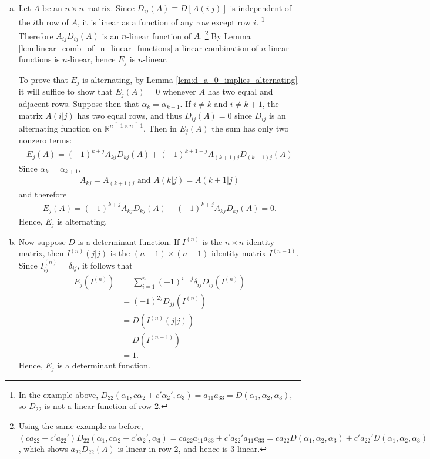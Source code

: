 \documentclass[12pt,letterpaper,reqno]{article}
\numberwithin{equation}{section}
\begin{document}
\begin{pf}
\begin{enumerate}[(a)]
	 \item Let $A$ be an $n \times n$ matrix. Since $D_{ij}(A)\equiv D[A(i \vert j)]$ is independent of the $i$th row of $A$, it is linear as a function of any row except row $i$. \footnote{In the example above, $D_{22}(\alpha_1,c\alpha_2+c'\alpha_2',\alpha_3)=a_{11}a_{33}=D(\alpha_1,\alpha_2,\alpha_3)$, so $D_{22}$ is not a linear function of row 2.} Therefore $A_{ij}D_{ij}(A)$ is an $n$-linear function of $A$. \footnote{Using the same example as before, $(ca_{22}+c'a_{22}')D_{22}(\alpha_1,c\alpha_2+c'\alpha_2',\alpha_3)=ca_{22}a_{11}a_{33}+c'a_{22}'a_{11}a_{33}=ca_{22}D(\alpha_1,\alpha_2,\alpha_3)+c'a_{22}'D(\alpha_1,\alpha_2,\alpha_3)$, which shows $a_{22}D_{22}(A)$ is linear in row 2, and hence is 3-linear.} By Lemma \ref{lem:linear_comb_of_n_linear_functions} a linear combination of $n$-linear functions is $n$-linear, hence $E_j$ is $n$-linear. 
	
	To prove that $E_j$ is alternating, by Lemma \ref{lem:d_a_0_implies_alternating} it will suffice to show that $E_j(A)=0$ whenever $A$ has two equal and adjacent rows. Suppose then that $\alpha_k=\alpha_{k+1}$. If $i \neq k$ and $i \neq k+1$, the matrix $A(i \vert j)$ has two equal rows, and thus $D_{ij}(A)=0$ since $D_{ij}$ is an alternating function on $\mathbb{R}^{\overline{n-1} \times \overline{n-1}}$. Then in $E_j(A)$ the sum has only two nonzero terms:
	\begin{align*}
		E_j(A)=(-1)^{k+j}A_{kj}D_{kj}(A)+(-1)^{k+1+j}A_{(k+1)j}D_{(k+1)j}(A)
	\end{align*}
	Since $\alpha_k=\alpha_{k+1}$,
	\begin{align*}
		A_{kj}=A_{(k+1)j} \text{ and } A(k|j)=A(k+1|j)
	\end{align*}
	and therefore
	\begin{align*}
		E_j(A)=(-1)^{k+j}A_{kj}D_{kj}(A)-(-1)^{k+j}A_{kj}D_{kj}(A)=0.
	\end{align*}
	Hence, $E_j$ is alternating.
	
\item 	Now suppose $D$ is a determinant function. If $I^{(n)}$ is the $n \times n$ identity matrix, then $I^{(n)}(j \vert j)$ is the $(n-1) \times (n-1)$ identity matrix $I^{(n-1)}$. Since $I^{(n)}_{ij}=\delta_{ij}$, it follows that
	\begin{align*}
		E_j(I^{(n)})&=\sum_{i=1}^n(-1)^{i+j}\delta_{ij}D_{ij}(I^{(n)}) \\
		&=(-1)^{2j}D_{jj}(I^{(n)}) \\
		&=D(I^{(n)}(j|j)) \\
		&=D(I^{(n-1)})\\
		&=1.
	\end{align*}
	Hence, $E_j$ is a determinant function.	
\end{enumerate}	
\end{pf}
\end{document}

